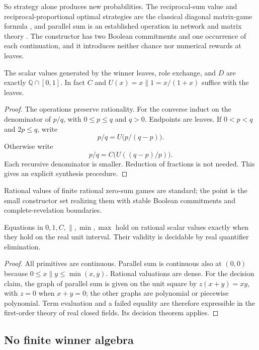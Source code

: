 So strategy alone produces new probabilities. The reciprocal-sum value and reciprocal-proportional optimal strategies are the classical diagonal matrix-game formula \cite[Part~II, Section~3.3]{FergusonNotes}, and parallel sum is an established operation in network and matrix theory \cite{AndersonDuffin1969}. The constructor has two Boolean commitments and one occurrence of each continuation, and it introduces neither chance nor numerical rewards at leaves.

\begin{proposition}\label{se:thm:rational}
The scalar values generated by the winner leaves, role exchange, and
$D$ are exactly $\mathbb Q\cap[0,1]$. In fact $C$ and
$U(x)=x\parallel1=x/(1+x)$ suffice with the leaves.
\end{proposition}
\begin{proof}
The operations preserve rationality. For the converse induct on the
denominator of $p/q$, with $0\leq p\leq q$ and $q>0$. Endpoints are
leaves. If $0<p<q$ and $2p\leq q$, write
\[
 p/q=U\bigl(p/(q-p)\bigr).
\]
Otherwise write
\[
 p/q=C\bigl(U((q-p)/p)\bigr).
\]
Each recursive denominator is smaller. Reduction of fractions is not
needed. This gives an explicit synthesis procedure.
\end{proof}

Rational values of finite rational zero-sum games are standard; the point is the small constructor set realizing them with stable Boolean commitments and complete-revelation boundaries.

\begin{corollary}\label{se:cor:decidable}
Equations in $0,1,C,\parallel,\min,\max$ hold on rational scalar
values exactly when they hold on the real unit interval. Their validity
is decidable by real quantifier elimination.
\end{corollary}
\begin{proof}
All primitives are continuous. Parallel sum is continuous also at
$(0,0)$ because $0\leq x\parallel y\leq\min(x,y)$.
Rational valuations are dense. For the decision claim, the graph of
parallel sum is given on the unit square by $z(x+y)=xy$, with $z=0$
when $x+y=0$; the other graphs are polynomial or piecewise polynomial.
Term evaluation and a failed equality are therefore expressible in the
first-order theory of real closed fields. Its decision theorem applies.
\end{proof}

\subsection{No finite winner algebra}\label{app:sealed-infinite}

